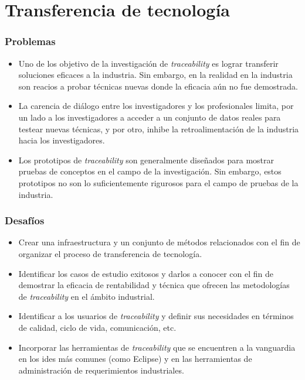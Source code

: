 \documentclass[a4paper,12pt,oneside,spanish]{book}
\begin{document}
\section{Transferencia de tecnología}

\subsubsection{Problemas}

\begin{itemize}[label={$\times$}]

\item Uno de los objetivo de la investigación de \textit{traceability} es lograr transferir soluciones eficaces a la industria. Sin embargo, en la realidad en la industria son reacios a probar técnicas nuevas donde la eficacia aún no fue demostrada.

\item La carencia de diálogo entre los investigadores y los profesionales limita, por un lado a los investigadores a acceder a un conjunto de datos reales para testear nuevas técnicas, y por otro, inhibe la retroalimentación de la industria hacia los investigadores.

\item Los prototipos de \textit{traceability} son generalmente diseñados para mostrar pruebas de conceptos en el campo de la investigación. Sin embargo, estos prototipos no son lo suficientemente rigurosos para el campo de pruebas de la industria.

\end{itemize}

\subsubsection{Desafíos}

\begin{itemize}[label={\checkmark}]

\item Crear una infraestructura y un conjunto de métodos relacionados con el fin de organizar el proceso de transferencia de tecnología.

\item Identificar los casos de estudio exitosos y darlos a conocer con el fin de demostrar la eficacia de rentabilidad y técnica que ofrecen las metodologías de \textit{traceability} en el ámbito industrial.

\item Identificar a los usuarios de \textit{traceability} y definir sus necesidades en términos de calidad, ciclo de vida, comunicación, etc.

\item Incorporar las herramientas de \textit{traceability} que se encuentren a la vanguardia en los \glspl{ide} más comunes (como \textsf{Eclipse}) y en las herramientas de administración de requerimientos industriales.

\end{itemize}
\end{document}
